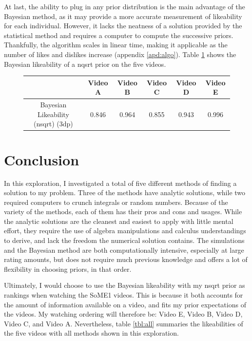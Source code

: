 \documentclass[a4paper,11pt]{article}
\begin{document}
At last, the ability to plug in any prior distribution is the main advantage of the Bayesian method, as it may provide a more accurate measurement of likeability for each individual. However, it lacks the neatness of a solution provided by the statistical method and requires a computer to compute the successive priors. Thankfully, the algorithm scales in linear time, making it applicable as the number of likes and dislikes increase (appendix \ref{apd:algo}). Table \ref{tbl:baye} shows the Bayesian likeability of a nqsrt prior on the five videos.

\begin{figure}[H]
    \centering
    \begin{tabular}{c|c|c|c|c|c}
        & Video A & Video B & Video C & Video D & Video E \\
        \hline
        \hline
        Bayesian Likeability (nsqrt) (3dp) & 0.846 & 0.964 & 0.855 & 0.943 & 0.996
    \end{tabular}
    \label{tbl:baye}
\end{figure}

\section{Conclusion}
In this exploration, I investigated a total of five different methods of finding a solution to my problem. Three of the methods have analytic solutions, while two required computers to crunch integrals or random numbers. Because of the variety of the methods, each of them has their pros and cons and usages. While the analytic solutions are the cleanest and easiest to apply with little mental effort, they require the use of algebra manipulations and calculus understandings to derive, and lack the freedom the numerical solution contains. The simulations and the Bayesian method are both computationally intensive, especially at large rating amounts, but does not require much previous knowledge and offers a lot of flexibility in choosing priors, in that order.

Ultimately, I would choose to use the Bayesian likeability with my nsqrt prior as rankings when watching the SoME1 videos. This is because it both accounts for the amount of information available on a video, and fits my prior expectations of the videos. My watching ordering will therefore be: Video E, Video B, Video D, Video C, and Video A. Nevertheless, table \ref{tbl:all} summaries the likeabilities of the five videos with all methods shown in this exploration.
\end{document}

